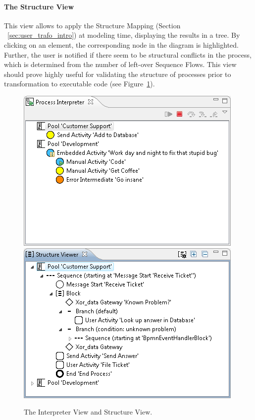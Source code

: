 \paragraph*{The Structure View}
This view allows to apply the Structure Mapping (Section ~\ref{sec:user_trafo_intro})
at modeling time, displaying the results in a tree.  By clicking on an element,
the corresponding node in the diagram is highlighted.  Further, the user is
notified if there seem to be structural conflicts in the process, which is
determined from the number of left-over Sequence Flows.  This view should prove
highly useful for validating the structure of processes prior to transformation
to executable code (see Figure~\ref{fig:customViews2}).

\begin{figure}[t]
	\centering
	\includegraphics[width=.4\textwidth]{figures/features/interpreterView.png}
	\hspace{.5cm}
	\includegraphics[width=.4\textwidth]{figures/features/structureView.png}
	\caption{The Interpreter View and Structure View.}
	\label{fig:customViews2}
\end{figure}

